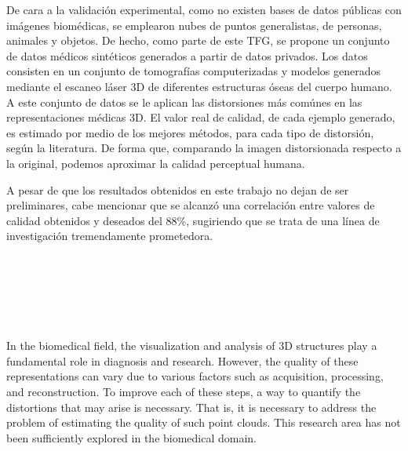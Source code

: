 De cara a la validación experimental, como no existen bases de datos públicas con imágenes 
biomédicas, se emplearon nubes de puntos generalistas, de personas, animales y objetos. 
De hecho, como parte de este TFG, se propone un conjunto de datos médicos sintéticos 
generados a partir de datos privados. 
Los datos consisten en un conjunto de tomografías computerizadas y modelos 
generados mediante el escaneo láser 3D de diferentes estructuras óseas del cuerpo 
humano. A este conjunto de datos se le aplican las distorsiones más comúnes 
en las representaciones médicas 3D. 
El valor real de calidad, de cada ejemplo generado, es estimado por medio de 
los mejores métodos, para cada tipo de distorsión, según la literatura. De forma que, 
comparando la imagen distorsionada respecto a la original, 
podemos aproximar la calidad perceptual humana.
\smallskip

A pesar de que los resultados obtenidos en este trabajo no dejan de ser preliminares, 
cabe mencionar que se alcanzó una correlación entre valores de calidad obtenidos y 
deseados del 88\%, sugiriendo que se trata de una línea de investigación tremendamente 
prometedora. 

\cleardoublepage


\thispagestyle{empty}


\begin{center}
{\large\bfseries \myTitleENG}\\
\end{center}
\begin{center}
\myName \\
\end{center}

\\

\\

In the biomedical field, the visualization and analysis of 3D structures play 
a fundamental role in diagnosis and research. However, the quality of these 
representations can vary due to various factors such as acquisition, processing, 
and reconstruction. To improve each of these steps, a way to quantify the distortions 
that may arise is necessary. That is, it is necessary to address the problem of 
estimating the quality of such point clouds. This research area has not been 
sufficiently explored in the biomedical domain.
\smallskip

